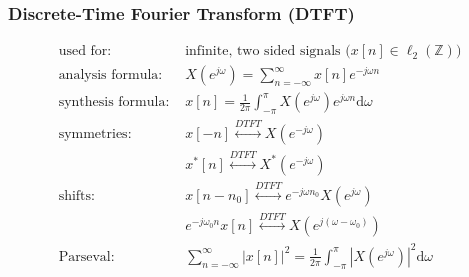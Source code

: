 \documentclass{article}
\begin{document}
\begin{multicols}{2}
\subsubsection{Discrete-Time Fourier Transform (DTFT)}
$$
\begin{array}{ll}
\text{used for:} & \text{infinite, two sided signals (}x[n] \in \ell_2(\mathbb{Z})\text{)} \\
\text{analysis formula: }& X(e^{j\omega}) = \displaystyle \sum_{n=-\infty}^\infty x[n]e^{-j\omega n} \\
\text{synthesis formula: }& x[n]= \displaystyle \frac1{2\pi}  \int_{-\pi}^\pi X(e^{j\omega}) e^{j\omega n}\mathrm{d}\omega \\
\text{symmetries:} & x[-n]   \overset{DTFT}{\longleftrightarrow}  X(e^{-j\omega}) \\
&x^*[n]   \overset{DTFT}{\longleftrightarrow}  X^*(e^{-j\omega}) \\
\text{shifts:} & x[n-n_0]  \overset{DTFT}{\longleftrightarrow} e^{-j\omega n_0}X(e^{j\omega})\\
& e^{-j\omega_0 n}x[n] \overset{DTFT}{\longleftrightarrow} X(e^{j(\omega-\omega_0)}) \\
\text{Parseval:} & \displaystyle \sum_{n=-\infty}^\infty \left | x[n] \right | ^2 = \frac1{2\pi} \displaystyle \int_{-\pi}^\pi \left | X(e^{j\omega}) \right | ^2 \mathrm{d} \omega
\end{array}
$$

\end{multicols}
\end{document}
